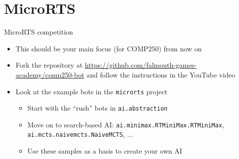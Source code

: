 \part{MicroRTS}
\frame{\partpage}

\begin{frame}{MicroRTS competition}
	\begin{itemize}
		\pause\item This should be your main focus (for COMP250) from now on
		\pause\item Fork the repository at \url{https://github.com/falmouth-games-academy/comp250-bot}
			and follow the instructions in the YouTube video
		\pause\item Look at the example bots in the \texttt{microrts} project
			\begin{itemize}
				\pause\item Start with the ``rush'' bots in \texttt{ai.abstraction}
				\pause\item Move on to search-based AI: \texttt{ai.minimax.RTMiniMax.RTMiniMax},
					\texttt{ai.mcts.naivemcts.NaiveMCTS}, ...
				\pause\item Use these samples as a basis to create your own AI
			\end{itemize}
	\end{itemize}
\end{frame}
